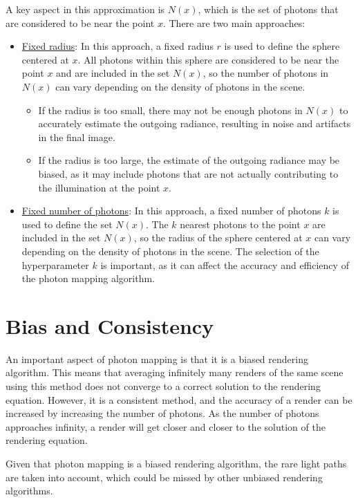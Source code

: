 A key aspect in this approximation is $N(x)$, which is the set of photons that are considered to be near the point $x$. There are two main approaches:
\begin{itemize}
    \item \ul{Fixed radius}: In this approach, a fixed radius $r$ is used to define the sphere centered at $x$. All photons within this sphere are considered to be near the point $x$ and are included in the set $N(x)$, so the number of photons in $N(x)$ can vary depending on the density of photons in the scene.
    \begin{itemize}
        \item If the radius is too small, there may not be enough photons in $N(x)$ to accurately estimate the outgoing radiance, resulting in noise and artifacts in the final image.
        \item If the radius is too large, the estimate of the outgoing radiance may be biased, as it may include photons that are not actually contributing to the illumination at the point $x$.
    \end{itemize}
    \item \ul{Fixed number of photons}: In this approach, a fixed number of photons $k$ is used to define the set $N(x)$. The $k$ nearest photons to the point $x$ are included in the set $N(x)$, so the radius of the sphere centered at $x$ can vary depending on the density of photons in the scene. The selection of the hyperparameter $k$ is important, as it can affect the accuracy and efficiency of the photon mapping algorithm.
\end{itemize}

\section{Bias and Consistency}

An important aspect of photon mapping is that it is a biased rendering algorithm. This means that averaging infinitely many renders of the same scene using this method does not converge to a correct solution to the rendering equation. However, it is a consistent method, and the accuracy of a render can be increased by increasing the number of photons. As the number of photons approaches infinity, a render will get closer and closer to the solution of the rendering equation.

Given that photon mapping is a biased rendering algorithm, the rare light paths are taken into account, which could be missed by other unbiased rendering algorithms.

